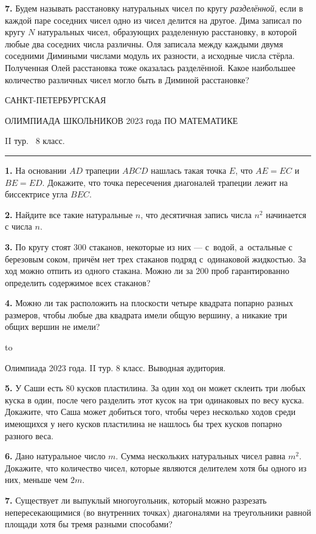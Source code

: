 \documentclass[12pt]{article}
\def\q#1.{{\bf #1. }}
\def\dotline{\smallskip\hbox to \hsize{\dotfill}\medskip}
\begin{document}
\q7. Будем называть расстановку натуральных чисел по кругу
\textit{разделённой}, если в каждой паре соседних чисел одно из чисел делится на другое. Дима записал по кругу $N$ натуральных чисел, образующих разделенную расстановку, в которой любые два соседних числа различны. 
Оля записала между каждыми двумя соседними Димиными числами модуль их разности, а исходные числа стёрла. Полученная Олей расстановка тоже оказалась разделённой. 
Какое наибольшее количество различных чисел могло быть в Диминой расстановке?


\clearpage

\centerline{\sc САНКТ-ПЕТЕРБУРГСКАЯ}
\centerline{\sc ОЛИМПИАДА ШКОЛЬНИКОВ 2023 года ПО МАТЕМАТИКЕ}
\centerline{\sc II тур. \ 8 класс.}
\medskip
\hrule
\bigskip

\q1. На основании $AD$ трапеции $ABCD$ нашлась такая точка $E$, что $AE = EC$ и $BE = ED$. Докажите, что точка пересечения диагоналей трапеции лежит на биссектрисе угла $BEC$.

\q2. Найдите все такие натуральные $n$, что десятичная запись числа $n^2$ начинается с числа $n$. 

\q3. По кругу стоят 300 стаканов, некоторые из них --- с~водой, а~остальные с березовым соком, причём нет трех стаканов подряд с~одинаковой жидкостью. За ход можно отпить из одного стакана. Можно ли за 200 проб гарантированно определить содержимое всех стаканов? 

\q4. Можно ли так расположить на плоскости четыре квадрата попарно разных размеров, чтобы любые два квадрата имели общую вершину, а никакие три общих вершин не имели?

\dotline

\centerline{Олимпиада 2023 года. II тур. 8 класс. Выводная аудитория.}
\smallskip

\q5. У Саши есть 80 кусков пластилина. За один ход он может склеить три любых куска в один, после чего разделить этот кусок на три одинаковых по весу куска. Докажите, что Саша может добиться того, чтобы через несколько ходов среди имеющихся у него кусков пластилина не нашлось бы трех кусков попарно разного веса.

\q6. Дано натуральное число $m$. Сумма нескольких натуральных чисел равна $m^2$. Докажите, что количество чисел, которые являются делителем хотя бы одного из них, меньше чем $2m$.

\q7. Существует ли выпуклый многоугольник, который можно разрезать непересекающимися (во внутренних точках) диагоналями на треугольники равной площади хотя бы тремя разными способами?
\end{document}
